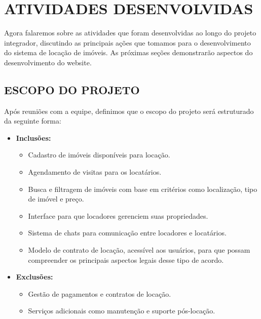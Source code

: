 \chapter{ATIVIDADES DESENVOLVIDAS}

Agora falaremos sobre as atividades que foram desenvolvidas ao longo do projeto integrador, discutindo as principais ações que tomamos para o desenvolvimento do sistema de locação de imóveis. As próximas seções demonstrarão aspectos do desenvolvimento do website.









\section{ESCOPO DO PROJETO}
Após reuniões com a equipe, definimos que o escopo do projeto será estruturado da seguinte forma:



\begin{itemize}
    \item \textbf{Inclusões:}
    \begin{itemize}
        \item Cadastro de imóveis disponíveis para locação.
        \item Agendamento de visitas para os locatários.
        \item Busca e filtragem de imóveis com base em critérios como localização, tipo de imóvel e preço.
        \item Interface para que locadores gerenciem suas propriedades.
        \item Sistema de chats para comunicação entre locadores e locatários.
        \item Modelo de contrato de locação, acessível aos usuários, para que possam compreender os principais aspectos legais desse tipo de acordo.
    \end{itemize}
    
    \item \textbf{Exclusões:}
    \begin{itemize}
        \item Gestão de pagamentos e contratos de locação.
        \item Serviços adicionais como manutenção e suporte pós-locação.
    \end{itemize}
\end{itemize}

